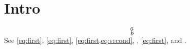 \section{Intro}
\begin{equation}\label{eq:first}a\end{equation}
\begin{equation}\label{eq:second}b\end{equation}
See \eqref{eq:first}, \autoref{eq:first}, \cref{eq:first,eq:second}, , \vref{eq:first}, and .
